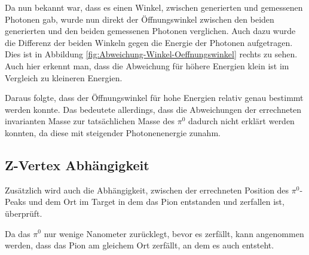 \documentclass[a4paper,11pt,oneside,final,german,openbib,pdftex]{scrbook}
\begin{document}
{Da nun bekannt war, dass es einen Winkel, zwischen generierten und gemessenen Photonen gab, wurde nun direkt der \"Offnungswinkel zwischen den beiden generierten und den beiden gemessenen Photonen verglichen. Auch dazu wurde die Differenz der beiden Winkeln gegen die Energie der Photonen aufgetragen. 
%		
%	
Dies ist in Abbildung \ref{fig:Abweichung-Winkel-Oeffnungswinkel} rechts zu sehen. Auch hier erkennt man, dass die Abweichung f\"ur h\"ohere Energien klein ist im Vergleich zu kleineren Energien. 

Daraus folgte, dass der \"Offnungswinkel f\"ur hohe Energien relativ genau bestimmt werden konnte. Das bedeutete allerdings, dass die Abweichungen der errechneten invarianten Masse zur tats\"achlichen Masse des $\pi^0$ dadurch nicht erkl\"art werden konnten, da diese mit steigender Photonenenergie zunahm. 




\subsection{Z-Vertex Abh\"angigkeit}
\label{sec:Z-Vertex-Abhaengigkeit}


Zusätzlich wird auch die Abh\"angigkeit, zwischen der errechneten  Position des $\pi^0$-Peaks und dem Ort im Target in dem das Pion entstanden und zerfallen ist, \"uberpr\"uft. 

Da das $\pi^0$ nur wenige Nanometer zur\"ucklegt, bevor es zerf\"allt, kann angenommen werden, dass das Pion am gleichem Ort zerf\"allt, an dem es auch entsteht.

 
}
\end{document}
